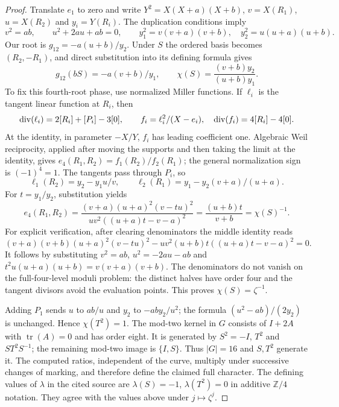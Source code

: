 \documentclass[11pt]{article}
\theoremstyle{remark}\newtheorem{remark}[theorem]{Remark}
\newcommand{\Z}{\mathbb Z}\newcommand{\Q}{\mathbb Q}
\begin{document}
\begin{proof}
Translate $e_1$ to zero and write
$Y^2=X(X+a)(X+b)$, $v=X(R_1)$, $u=X(R_2)$ and $y_i=Y(R_i)$.
The duplication conditions imply
\[
 v^2=ab,\qquad u^2+2au+ab=0,\qquad
 y_1^2=v(v+a)(v+b),\quad y_2^2=u(u+a)(u+b).
\]
Our root is $g_{12}=-a(u+b)/y_2$. Under $S$ the ordered basis becomes
$(R_2,-R_1)$, and direct substitution into its defining formula gives
\[
 g_{12}(bS)=-a(v+b)/y_1,\qquad
 \chi(S)=\frac{(v+b)y_2}{(u+b)y_1}.
\]
To fix this fourth-root phase, use normalized Miller functions.
If $\ell_i$ is the tangent linear function at $R_i$, then
\[
 \operatorname{div}(\ell_i)=2[R_i]+[P_i]-3[0],\qquad
 f_i=\ell_i^2/(X-e_i),\quad\operatorname{div}(f_i)=4[R_i]-4[0].
\]
At the identity, in parameter $-X/Y$, $f_i$ has leading coefficient
one. Algebraic Weil reciprocity, applied after moving the supports
and then taking the limit at the identity, gives
$e_4(R_1,R_2)=f_1(R_2)/f_2(R_1)$; the general normalization sign is
$(-1)^4=1$. The tangents pass through $P_i$, so
\[
 \ell_1(R_2)=y_2-y_1u/v,\qquad
 \ell_2(R_1)=y_1-y_2(v+a)/(u+a).
\]
For $t=y_1/y_2$, substitution yields
\[
 e_4(R_1,R_2)
 =\frac{(v+a)(u+a)^2(v-tu)^2}
 {uv^2((u+a)t-v-a)^2}
 =\frac{(u+b)t}{v+b}=\chi(S)^{-1}.
\]
For explicit verification, after clearing denominators the middle
identity reads
\[
 (v+a)(v+b)(u+a)^2(v-tu)^2
 -uv^2(u+b)t((u+a)t-v-a)^2=0.
\]
It follows by substituting $v^2=ab$, $u^2=-2au-ab$ and
$t^2u(u+a)(u+b)=v(v+a)(v+b)$. The denominators do not vanish on
the full-four-level moduli problem: the distinct halves have order
four and the tangent divisors avoid the evaluation points.
This proves $\chi(S)=\zeta^{-1}$.

Adding $P_1$ sends $u$ to $ab/u$ and $y_2$ to $-ab y_2/u^2$;
the formula $(u^2-ab)/(2y_2)$ is unchanged. Hence $\chi(T^2)=1$.
The mod-two kernel in $G$ consists of $I+2A$ with
$\operatorname{tr}(A)=0$ and has order eight. It is generated by
$S^2=-I$, $T^2$ and $ST^2S^{-1}$; the remaining mod-two image is
$\{I,S\}$. Thus $|G|=16$ and $S,T^2$ generate it. The computed
ratios, independent of the curve, multiply under successive changes
of marking, and therefore define the claimed full character.
The defining values of $\lambda$ in the cited source are
$\lambda(S)=-1$, $\lambda(T^2)=0$ in additive $\Z/4$ notation.
They agree with the values above under $j\mapsto\zeta^j$.
\end{proof}
\end{document}
